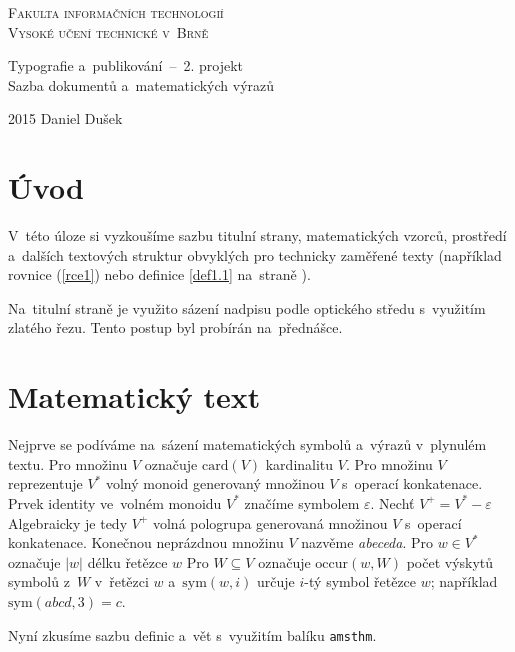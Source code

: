\documentclass[a4paper, 11pt]{article}
\begin{document}
\thispagestyle{empty}
\begin{center}
	\Huge
	\textsc{Fakulta informačních technologií\\\vspace{-0.35cm}Vysoké učení technické v~Brně}\\
	\LARGE
		
		Typografie a~publikování \,--\ 2. projekt\\\vspace{-0.10cm}Sazba dokumentů a~matematických výrazů
	
	{\Large 2015 \hfill Daniel Dušek }
\end{center}



\newpage
\setcounter{page}{1}
\twocolumn

\section*{Úvod}
V~této úloze si vyzkoušíme sazbu titulní strany, matematických vzorců, prostředí a~dalších textových struktur obvyklých pro technicky zaměřené texty (například rovnice (\ref{rce1}) nebo definice \ref{def1.1} na~straně \pageref{def1.1}).

\par Na~titulní straně je využito sázení nadpisu podle optického středu s~využitím zlatého řezu. Tento postup byl probírán na~přednášce.

\section{Matematický text}
Nejprve se podíváme na~sázení matematických symbolů a~výrazů v~plynulém textu. Pro množinu $V$ označuje $\mbox{card}(V)$ kardinalitu $V$. Pro množinu $V$ reprezentuje $V^*$ volný monoid generovaný množinou $V$ s~operací konkatenace.
Prvek identity ve~volném monoidu $V^*$ značíme symbolem $\varepsilon$. Nechť $V^+ = V^* - \varepsilon$ Algebraicky je tedy $V^+$ volná pologrupa generovaná množinou $V$ s~operací konkatenace.
Konečnou neprázdnou množinu $V$ nazvěme \emph{abeceda}.
Pro $w \in V^*$ označuje $|w|$ délku řetězce $w$ Pro $W \subseteq V$ označuje $\mbox{occur}(w,W)$ počet výskytů symbolů z~$W$ v~řetězci $w$ a~$\mbox{sym}(w,i)$ určuje $i$-tý symbol řetězce $w$; například $\mbox{sym}(abcd,3) = c$.
\par Nyní zkusíme sazbu definic a~vět s~využitím balíku \texttt{amsthm}.
\end{document}
